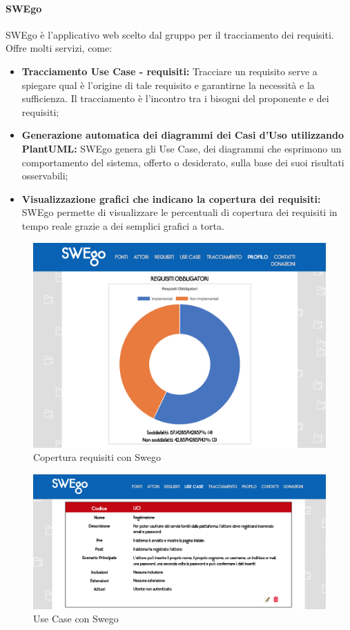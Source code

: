 		\paragraph{SWEgo}
		\label {sec:SWEgo}
		\Spazio
		SWEgo è l'applicativo web scelto dal gruppo per il tracciamento dei requisiti. Offre molti servizi, come:
		\begin{itemize}
			\item \textbf{Tracciamento Use Case - requisiti:}
			Tracciare un requisito serve a spiegare qual è l'origine di tale requisito e garantirne la necessità e la sufficienza. Il tracciamento è l'incontro tra i bisogni del proponente e dei requisiti;
			\item \textbf{Generazione automatica dei diagrammi dei Casi d'Uso utilizzando PlantUML:}
			SWEgo genera gli Use Case, dei diagrammi che esprimono un comportamento del sistema, offerto o desiderato, sulla base dei suoi risultati osservabili;
			\item \textbf{Visualizzazione grafici che indicano la copertura dei requisiti: }
			SWEgo permette di visualizzare le percentuali di copertura dei requisiti in tempo reale grazie a dei semplici grafici a torta.
		\end{itemize}
		\begin{figure}[H]
		\label{figuraSwego}
		\centering 
		\includegraphics[width=1\textwidth]{images/swego1.png}
		\caption{Copertura requisiti con Swego} %
		\end{figure}
	
	\begin{figure}[H]
	\label{figuraSwego}
	\centering 
	\includegraphics[width=1\textwidth]{images/swego2.png}
	\caption{Use Case con Swego} %
	\end{figure}


